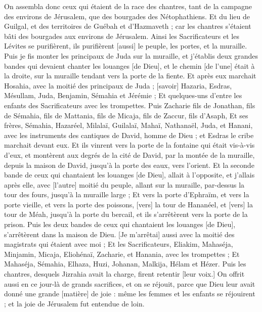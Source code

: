\begin{multicols}{2}
{On assembla donc ceux qui étaient de la race des chantres, tant de la campagne des environs de Jérusalem, que des bourgades des Nétophathiens.
Et du lieu de Guilgal, et des territoires de Guébah et d'Hazmaveth ; car les chantres s'étaient bâti des bourgades aux environs de Jérusalem.
Ainsi les Sacrificateurs et les Lévites se purifièrent, ils purifièrent [aussi] le peuple, les portes, et la muraille.
Puis je fis monter les principaux de Juda sur la muraille, et j'établis deux grandes bandes qui devaient chanter les louanges [de Dieu], et le chemin [de l'une] était à la droite, sur la muraille tendant vers la porte de la fiente.
Et après eux marchait Hosahia, avec la moitié des principaux de Juda ;
[savoir] Hazaria, Esdras, Mésullam,
Juda, Benjamin, Sémahia et Jérémie ;
Et quelques-uns d'entre les enfants des Sacrificateurs avec les trompettes. Puis Zacharie fils de Jonathan, fils de Sémahia, fils de Mattania, fils de Micaja, fils de Zaccur, fils d'Asaph,
Et ses frères, Sémahia, Hazaréel, Milalaï, Guilalaï, Mahaï, Nathanaël, Juda, et Hanani, avec les instruments des cantiques de David, homme de Dieu ; et Esdras le cribe marchait devant eux.
Et ils vinrent vers la porte de la fontaine qui était vis-à-vis d'eux, et montèrent aux degrés de la cité de David, par la montée de la muraille, depuis la maison de David, jusqu'à la porte des eaux, vers l'orient.
Et la seconde bande de ceux qui chantaient les louanges [de Dieu], allait à l'opposite, et j'allais après elle, avec [l'autre] moitié du peuple, allant sur la muraille, par-dessus la tour des fours, jusqu'à la muraille large ;
Et vers la porte d'Ephraïm, et vers la porte vieille, et vers la porte des poissons, [vers] la tour de Hananéel, et [vers] la tour de Méah, jusqu'à la porte du bercail, et ils s'arrêtèrent vers la porte de la prison.
Puis les deux bandes de ceux qui chantaient les louanges [de Dieu], s'arrêtèrent dans la maison de Dieu. [Je m'arrêtai] aussi avec la moitié des magistrats qui étaient avec moi ;
Et les Sacrificateurs, Eliakim, Mahaséja, Minjamin, Micaja, Eliohénaï, Zacharie, et Hanania, avec les trompettes ;
Et Mahaséja, Sémahia, Elhaza, Huzi, Johanan, Malkija, Hélam et Hézer. Puis les chantres, desquels Jizrahia avait la charge, firent retentir [leur voix.]
On offrit aussi en ce jour-là de grands sacrifices, et on se réjouit, parce que Dieu leur avait donné une grande [matière] de joie : même les femmes et les enfants se réjouirent ; et la joie de Jérusalem fut entendue de loin.
}
\end{multicols}
